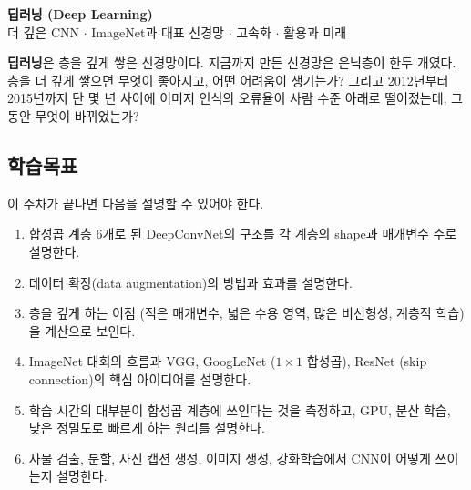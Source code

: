 \documentclass[11pt,a4paper]{article}
\begin{document}

\begin{center}
{\LARGE\bfseries 딥러닝 (Deep Learning)}\\[0.35em]
{\large 더 깊은 CNN $\cdot$ ImageNet과 대표 신경망 $\cdot$ 고속화 $\cdot$ 활용과 미래}\\[0.8em]
\end{center}

\vspace{0.4em}

\begin{keybox}[이번 주의 핵심 질문]
\textbf{딥러닝}은 층을 깊게 쌓은 신경망이다. 지금까지 만든 신경망은 은닉층이 한두 개였다.
층을 더 깊게 쌓으면 무엇이 좋아지고, 어떤 어려움이 생기는가?
그리고 2012년부터 2015년까지 단 몇 년 사이에 이미지 인식의 오류율이 사람 수준 아래로 떨어졌는데,
그동안 무엇이 바뀌었는가?
\end{keybox}

\subsection*{학습목표}

이 주차가 끝나면 다음을 설명할 수 있어야 한다.

\begin{enumerate}[label=\arabic*.]
\item 합성곱 계층 $6$개로 된 DeepConvNet의 구조를 각 계층의 shape과 매개변수 수로 설명한다.
\item 데이터 확장(data augmentation)의 방법과 효과를 설명한다.
\item 층을 깊게 하는 이점 (적은 매개변수, 넓은 수용 영역, 많은 비선형성, 계층적 학습)을 계산으로 보인다.
\item ImageNet 대회의 흐름과 VGG, GoogLeNet ($1\times1$ 합성곱), ResNet (skip connection)의 핵심 아이디어를 설명한다.
\item 학습 시간의 대부분이 합성곱 계층에 쓰인다는 것을 측정하고, GPU, 분산 학습, 낮은 정밀도로 빠르게 하는 원리를 설명한다.
\item 사물 검출, 분할, 사진 캡션 생성, 이미지 생성, 강화학습에서 CNN이 어떻게 쓰이는지 설명한다.
\end{enumerate}
\end{document}
